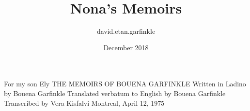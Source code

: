 \documentclass{article}
\title{Nona's Memoirs}
\author{david.etan.garfinkle}
\date{December 2018}
\begin{document}
For my son Ely 
THE MEMOIRS OF BOUENA GARFINKLE 
Written in Ladino by Bouena Garfinkle 
Translated verbatum to English by Bouena Garfinkle 
Transcribed by Vera Kisfalvi 
Montreal, April 12, 1975 



\maketitle
















\end{document}
